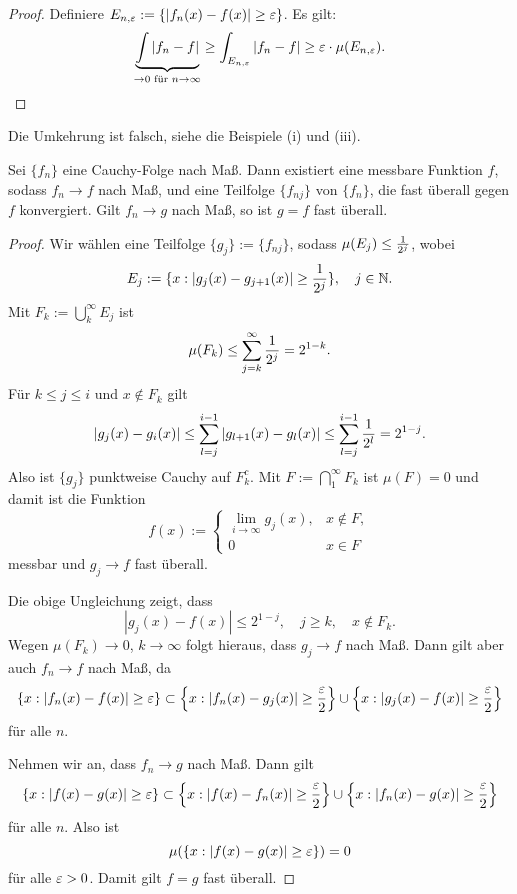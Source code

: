\begin{proof}
 Definiere $E_{n,\varepsilon} := \{ | f_n(x) - f(x) | \ge \varepsilon \}$. Es gilt:
 \[ \underbrace{\int | f_n - f |}_{\to 0 \text{ für } n \to \infty} \ge \int_{E_{n,\varepsilon}} | f_n - f | \ge \varepsilon \cdot \mu( E_{n,\varepsilon} ). \qedhere \]
\end{proof}

Die Umkehrung ist falsch, siehe die Beispiele (i) und (iii).

\begin{thm}
 Sei $\{ f_n \}$ eine Cauchy-Folge nach Maß. Dann existiert eine messbare Funktion $f$, sodass $f_n \to f$ nach Maß, und eine Teilfolge $\{ f_{nj} \}$ von $\{ f_n \}$, die fast überall gegen $f$ konvergiert. Gilt $f_n \to g$ nach Maß, so ist $g = f$ fast überall.
\end{thm}

\begin{proof}
 Wir wählen eine Teilfolge $\{ g_j \} := \{ f_{nj} \}$, sodass $\mu( E_j ) \le \frac{1}{2^j}$, wobei 
 \[ E_j := \{ x : | g_j(x) - g_{j+1}(x) | \ge \frac{1}{2^j} \}, \quad j \in \mathbb{N}. \]
 Mit $F_k := \bigcup_k^\infty E_j$ ist
 \[ \mu( F_k ) \le \sum_{j=k}^\infty \frac{1}{2^j} = 2^{1-k}. \]
 Für $k \le j \le i$ und $x \notin F_k$ gilt
 \[ | g_j(x) - g_i(x) | \le \sum_{l=j}^{i-1} | g_{l+1}(x) - g_l(x) | \le \sum_{l=j}^{i-1} \frac{1}{2^l} = 2^{1-j}. \]
 Also ist $\{g_j\}$ punktweise Cauchy auf $F_k^c$. Mit $F := \bigcap_1^\infty F_k$ ist $\mu(F) = 0$ und damit ist die Funktion
 \[ f(x) := \begin{cases} \lim_{i \to \infty} g_j(x), &x \notin F, \\ 0 &x \in F \end{cases} \]
 messbar und $g_j \to f$ fast überall.
 
 Die obige Ungleichung zeigt, dass
 \[ | g_j(x) - f(x) | \le 2^{1-j}, \quad j \ge k, \quad x \notin F_k. \]
 Wegen $\mu(F_k) \to 0$, $k \to \infty$ folgt hieraus, dass $g_j \to f$ nach Maß. Dann gilt aber auch $f_n \to f$ nach Maß, da
 \[ \{ x : | f_n(x) - f(x) | \ge \varepsilon \} \subset \left\{ x : | f_n(x) - g_j(x) | \ge \frac{\varepsilon}{2} \right\} \cup \left\{ x : | g_j(x) - f(x) | \ge \frac{\varepsilon}{2} \right\} \]
 für alle $n$.
 
 Nehmen wir an, dass $f_n \to g$ nach Maß. Dann gilt
 \[ \{ x : | f(x) - g(x) | \ge \varepsilon \} \subset \left\{ x : | f(x) - f_n(x) | \ge \frac{\varepsilon}{2} \right\} \cup \left\{ x : | f_n(x) - g(x) | \ge \frac{\varepsilon}{2} \right\} \]
 für alle $n$. Also ist
 \[ \mu( \{ x : | f(x) - g(x) | \ge \varepsilon \} ) = 0 \]
 für alle $\varepsilon > 0$. Damit gilt $f = g$ fast überall.
\end{proof}


